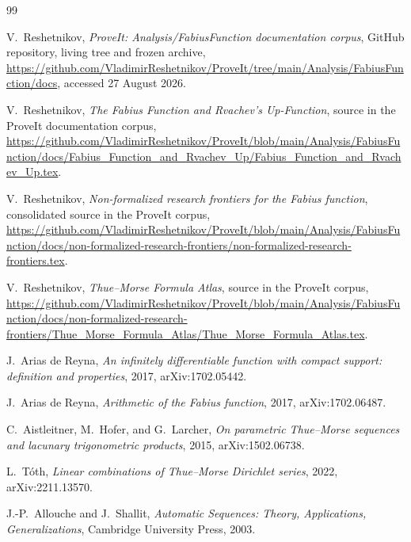 \documentclass[11pt]{article}
\numberwithin{equation}{section}
\theoremstyle{definition}
\theoremstyle{remark}
\begin{document}
\begin{thebibliography}{99}

V.~Reshetnikov,
\emph{ProveIt: Analysis/FabiusFunction documentation corpus},
GitHub repository, living tree and frozen archive,
\url{https://github.com/VladimirReshetnikov/ProveIt/tree/main/Analysis/FabiusFunction/docs},
accessed 27 August 2026.

V.~Reshetnikov,
\emph{The Fabius Function and Rvachev's Up-Function},
source in the ProveIt documentation corpus,
\url{https://github.com/VladimirReshetnikov/ProveIt/blob/main/Analysis/FabiusFunction/docs/Fabius_Function_and_Rvachev_Up/Fabius_Function_and_Rvachev_Up.tex}.

V.~Reshetnikov,
\emph{Non-formalized research frontiers for the Fabius function},
consolidated source in the ProveIt corpus,
\url{https://github.com/VladimirReshetnikov/ProveIt/blob/main/Analysis/FabiusFunction/docs/non-formalized-research-frontiers/non-formalized-research-frontiers.tex}.

V.~Reshetnikov,
\emph{Thue--Morse Formula Atlas},
source in the ProveIt corpus,
\url{https://github.com/VladimirReshetnikov/ProveIt/blob/main/Analysis/FabiusFunction/docs/non-formalized-research-frontiers/Thue_Morse_Formula_Atlas/Thue_Morse_Formula_Atlas.tex}.

J.~Arias de Reyna,
\emph{An infinitely differentiable function with compact support: definition and properties},
2017, arXiv:1702.05442.

J.~Arias de Reyna,
\emph{Arithmetic of the Fabius function},
2017, arXiv:1702.06487.

C.~Aistleitner, M.~Hofer, and G.~Larcher,
\emph{On parametric Thue--Morse sequences and lacunary trigonometric products},
2015, arXiv:1502.06738.

L.~T\'oth,
\emph{Linear combinations of Thue--Morse Dirichlet series},
2022, arXiv:2211.13570.

J.-P.~Allouche and J.~Shallit,
\emph{Automatic Sequences: Theory, Applications, Generalizations},
Cambridge University Press, 2003.

\end{thebibliography}
\end{document}
